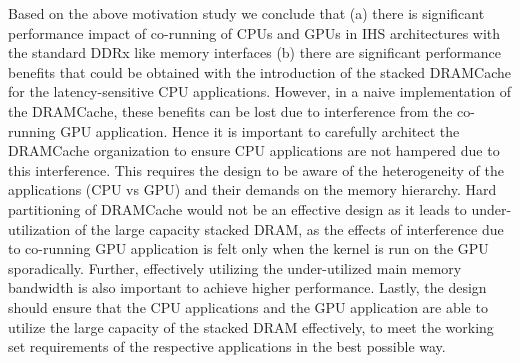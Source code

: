 \par Based on the above motivation study we conclude that (a) there is significant performance impact of co-running of CPUs and GPUs in IHS architectures with the standard DDRx like memory interfaces (b) there are significant performance benefits that could be obtained 
with the introduction of the stacked DRAMCache for the latency-sensitive CPU applications. However, in a naive implementation
of the DRAMCache, these benefits can be lost due to interference from the co-running GPU application.  Hence it is important to carefully 
architect the DRAMCache organization to ensure CPU applications are not hampered due to this interference.
This requires the design to be aware of the heterogeneity of the applications (CPU vs GPU) and their demands on the 
memory hierarchy.  Hard partitioning of DRAMCache would not be an effective design as it leads to under-utilization of the large capacity 
stacked DRAM, as the effects of interference due to co-running GPU application is felt only when the kernel is run on the GPU sporadically. 
Further, effectively utilizing the under-utilized main memory bandwidth \cite{micro-refresh, mainak-hpca, bear}
is also important to achieve higher performance.  Lastly, the design should ensure that the CPU applications and the 
GPU application are able to utilize the large capacity of the stacked DRAM effectively, to meet the working set 
requirements of the respective applications in the best possible way.


